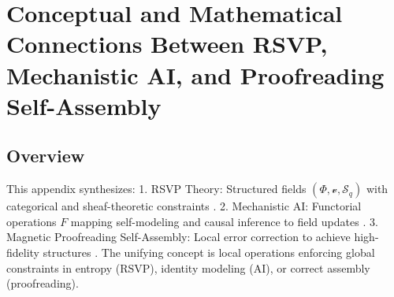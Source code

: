 \documentclass{article}
\theoremstyle{plain}
\theoremstyle{definition}
\begin{document}
\section{Conceptual and Mathematical Connections Between RSVP, Mechanistic AI, and Proofreading Self-Assembly}
\FloatBarrier
\subsection{Overview}
This appendix synthesizes:
1. RSVP Theory: Structured fields $(\Phi, \mathcal{v}, \mathcal{S}_q)$ with categorical and sheaf-theoretic constraints \cite{Soares2024}.
2. Mechanistic AI: Functorial operations $F$ mapping self-modeling and causal inference to field updates \cite{Bennett2025}.
3. Magnetic Proofreading Self-Assembly: Local error correction to achieve high-fidelity structures \cite{Liang2025}.
The unifying concept is local operations enforcing global constraints in entropy (RSVP), identity modeling (AI), or correct assembly (proofreading).
\end{document}
